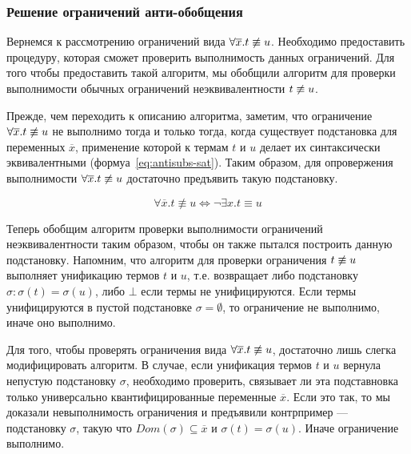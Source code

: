 \subsubsection{Решение ограничений анти-обобщения}

\label{sec:negation-antisubs}

Вернемся к рассмотрению ограничений вида ${\forall{\overline{x}}. t \not\equiv u}$.
Необходимо предоставить процедуру, которая сможет проверить выполнимость данных ограничений.
Для того чтобы предоставить такой алгоритм, 
мы обобщили алгоритм для проверки выполнимости 
обычных ограничений неэквивалентности $t \not\equiv u$.

Прежде, чем переходить к описанию алгоритма, заметим, 
что ограничение ${\forall{\overline{x}}. t \not\equiv u}$ не выполнимо тогда и только тогда, 
когда существует подстановка для переменных $\overline{x}$,
применение которой к термам $t$ и $u$ делает их 
синтаксически эквивалентными (формуа~\ref{eq:antisubs-sat}).
Таким образом, для опровержения выполнимости ${\forall{\overline{x}}. t \not\equiv u}$
достаточно предъявить такую подстановку.

\begin{equation}
\forall{\overline{x}}.t \not\equiv u \Leftrightarrow \neg \exists{x}. t \equiv u    
\label{eq:antisubs-sat}
\end{equation}

Теперь обобщим алгоритм проверки выполнимости ограничений неэквивалентности таким образом,
чтобы он также пытался построить данную подстановку.
Напомним, что алгоритм для проверки ограничения $t \not\equiv u$
выполняет унификацию термов $t$ и $u$, 
т.е. возвращает либо подстановку $\sigma : \sigma(t) = \sigma(u)$,
либо $\bot$ если термы не унифицируются.
Если термы унифицируются в пустой подстановке $\sigma = \emptyset$,
то ограничение не выполнимо, иначе оно выполнимо.

Для того, чтобы проверять ограничения вида ${\forall{\overline{x}}. t \not\equiv u}$,
достаточно лишь слегка модифицировать алгоритм.
В случае, если унификация термов $t$ и $u$ вернула 
непустую подстановку $\sigma$, 
необходимо проверить, связывает ли эта подставновка
только универсально квантифицированные переменные $\overline{x}$.
Если это так, то мы доказали невыполнимость ограничения 
и предъявили контрпример --- подстановку $\sigma$, 
такую что $Dom(\sigma) \subseteq \overline{x}$ и 
$\sigma(t) = \sigma(u)$.
Иначе ограничение выполнимо.

